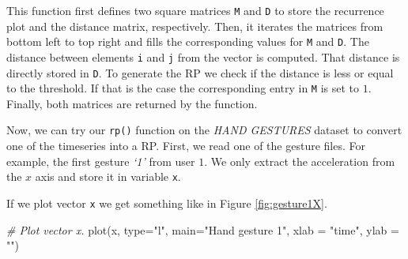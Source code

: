 \documentclass[
  11pt,
]{krantz}
\newenvironment{Shaded}{\begin{snugshade}}{\end{snugshade}}
\newcommand{\AttributeTok}[1]{\textcolor[rgb]{0.61,0.61,0.61}{#1}}
\newcommand{\CommentTok}[1]{\textcolor[rgb]{0.37,0.37,0.37}{\textit{#1}}}
\newcommand{\FunctionTok}[1]{\textcolor[rgb]{0,0,0}{#1}}
\newcommand{\NormalTok}[1]{#1}
\newcommand{\OtherTok}[1]{\textcolor[rgb]{0.37,0.37,0.37}{#1}}
\newcommand{\SpecialCharTok}[1]{\textcolor[rgb]{0,0,0}{#1}}
\newcommand{\StringTok}[1]{\textcolor[rgb]{0.5,0.5,0.5}{#1}}
\begin{document}
This function first defines two square matrices \texttt{M} and \texttt{D} to store the recurrence plot and the distance matrix, respectively. Then, it iterates the matrices from bottom left to top right and fills the corresponding values for \texttt{M} and \texttt{D}. The distance between elements \texttt{i} and \texttt{j} from the vector is computed. That distance is directly stored in \texttt{D}. To generate the RP we check if the distance is less or equal to the threshold. If that is the case the corresponding entry in \texttt{M} is set to \(1\). Finally, both matrices are returned by the function.

Now, we can try our \texttt{rp()} function on the \emph{HAND GESTURES} dataset to convert one of the timeseries into a RP. First, we read one of the gesture files. For example, the first gesture \emph{`1'} from user \(1\). We only extract the acceleration from the \(x\) axis and store it in variable \texttt{x}.

\begin{Shaded}
\end{Shaded}

If we plot vector \texttt{x} we get something like in Figure \ref{fig:gesture1X}.

\begin{Shaded}
\begin{Highlighting}[]
\CommentTok{\# Plot vector x.}
\FunctionTok{plot}\NormalTok{(x, }\AttributeTok{type=}\StringTok{"l"}\NormalTok{, }\AttributeTok{main=}\StringTok{"Hand gesture 1"}\NormalTok{, }\AttributeTok{xlab =} \StringTok{"time"}\NormalTok{, }\AttributeTok{ylab =} \StringTok{""}\NormalTok{)}
\end{Highlighting}
\end{Shaded}
\end{document}
